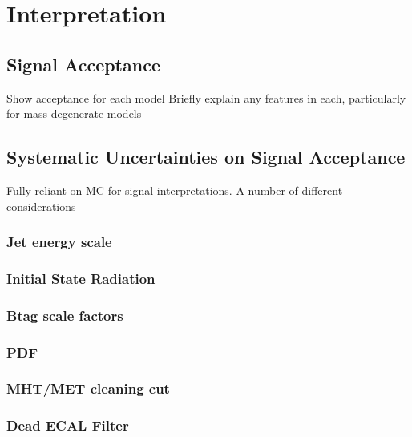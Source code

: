 \chapter{Interpretation}

\ifpdf
    \graphicspath{{Chapter9/Figs/Raster/}{Chapter9/Figs/PDF/}{Chapter9/Figs/}}
\else
    \graphicspath{{Chapter9/Figs/Vector/}{Chapter9/Figs/}}
\fi

\section{Signal Acceptance}  %
\label{sec:interpretation_acceptance}
Show acceptance for each model
Briefly explain any features in each, particularly for mass-degenerate models

\section{Systematic Uncertainties on Signal Acceptance }  %
\label{sec:interpretation_uncertainties}

Fully reliant on MC for signal interpretations.
A number of different considerations

\subsection{Jet energy scale}
\subsection{Initial State Radiation}
\subsection{Btag scale factors}
\subsection{PDF}
\subsection{MHT/MET cleaning cut}
\subsection{Dead ECAL Filter}
